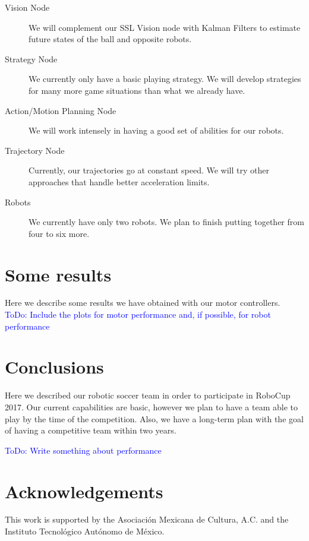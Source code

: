 \documentclass[]{llncs}
\newcommand{\TODO}[1]{{\textcolor{blue}{ToDo: {#1}}}}
\begin{document}
\begin{description}
	\item[Vision Node] We will complement our SSL Vision node with Kalman Filters to estimate future states of the ball and opposite robots.
	\item[Strategy Node] We currently only have a basic playing strategy. We will develop strategies for many more game situations than what we already have.
	\item[Action/Motion Planning Node] We will work intensely in having a good set of abilities for our robots.
	\item[Trajectory Node] Currently, our trajectories go at constant speed. We will try other approaches that handle better acceleration limits.
	\item[Robots] We currently have only two robots. We plan to finish putting together from four to six more.
\end{description}

\section{Some results}
Here we describe some results we have obtained with our motor controllers.
\TODO{Include the plots for motor performance and, if possible, for robot performance}

\section{Conclusions}

Here we described our robotic soccer team in order to participate in RoboCup 2017. Our current capabilities are basic, however we plan to have a team able to play by the time of the competition. Also, we have a long-term plan with the goal of having a competitive team within two years.

\TODO{Write something about performance}


\section{Acknowledgements}
This work is supported by the Asociación Mexicana de Cultura, A.C. and the Instituto Tecnológico Autónomo de México.



\end{document}
